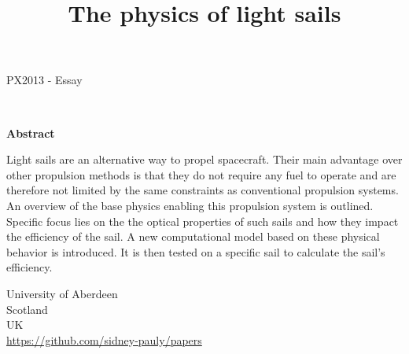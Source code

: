 \documentclass[14pt]{article}
\begin{document}
\title{The physics of light sails}
\date{}




\fancyhf{}



\begin{titlepage}
  \begin{center}
    \Large
    \textbf{\thetitle}
        
    \vspace{0.4cm}
    \large
    PX2013 - Essay
        
    \vspace{0.4cm}
    \textbf{\theauthor}\\
    \textbf{\theuoastudentid}

       
    \vspace{0.9cm}
    \textbf{Abstract}
    \end{center}
    Light sails are an alternative way to propel spacecraft. Their main advantage over other propulsion
    methods is that they do not require any fuel to operate and are therefore not limited by the same constraints
    as conventional propulsion systems.
    An overview of the base physics enabling this propulsion system is outlined. Specific focus lies on the
    the optical properties of such sails and how they impact the efficiency of the sail. 
    A new computational model based on these physical behavior is introduced. It is then tested
    on a specific sail to calculate the sail's efficiency.

  \vfill

  \begin{center}

    University of Aberdeen\\
    Scotland\\
    UK\\
    \thedate
    \vspace{0.4cm}
    \url{https://github.com/sidney-pauly/papers}
  \end{center}
\end{titlepage}
\end{document}
